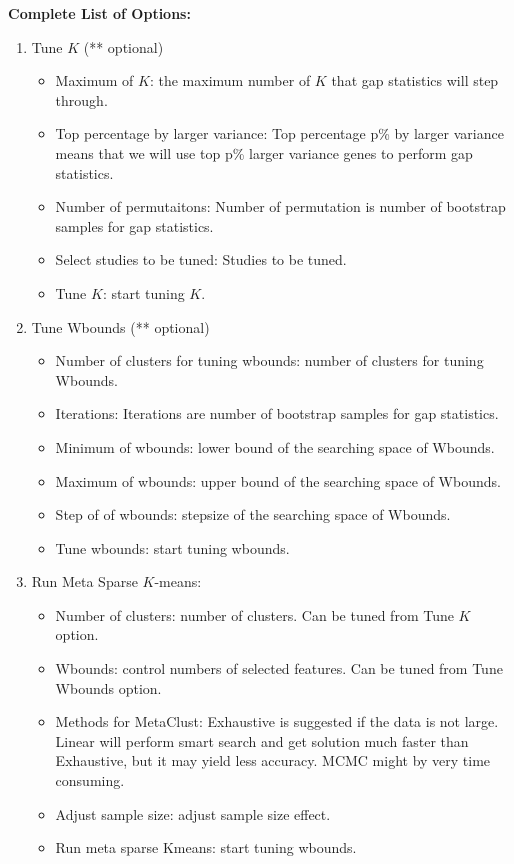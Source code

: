 \textbf{Complete List of Options:} 
\begin{enumerate}
\item Tune $K$ (** optional)
\begin{itemize}
\item Maximum of $K$: the maximum number of $K$ that gap statistics will step through.
\item Top percentage by larger variance: Top percentage p\% by larger variance means that we will use top p\% larger variance genes to perform gap statistics.
\item Number of permutaitons: Number of permutation is number of bootstrap samples for gap statistics.
\item Select studies to be tuned: Studies to be tuned.
\item Tune $K$: start tuning $K$.
\end{itemize}
\item Tune Wbounds (** optional)
\begin{itemize}
\item Number of clusters for tuning wbounds: number of clusters for tuning Wbounds.
\item Iterations: Iterations are number of bootstrap samples for gap statistics.
\item Minimum of wbounds: lower bound of the searching space of Wbounds.
\item Maximum of wbounds: upper bound of the searching space of Wbounds.
\item Step of of wbounds: stepsize of the searching space of Wbounds.
\item Tune wbounds: start tuning wbounds.
\end{itemize}
\item Run Meta Sparse $K$-means: 
\begin{itemize}
\item Number of clusters: number of clusters. Can be tuned from Tune $K$ option.
\item Wbounds: control numbers of selected features. Can be tuned from Tune Wbounds option.
\item Methods for MetaClust: Exhaustive is suggested if the data is not large.
Linear will perform smart search and get solution much faster than Exhaustive, 
but it may yield less accuracy.
MCMC might by very time consuming.
\item Adjust sample size: adjust sample size effect.
\item Run meta sparse Kmeans: start tuning wbounds.
\end{itemize}

\end{enumerate}

